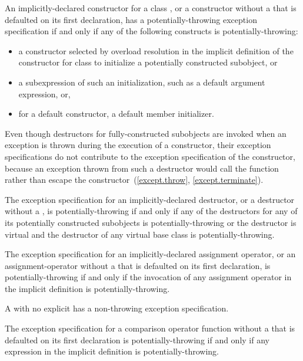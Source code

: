 \pnum
An implicitly-declared constructor for a class ,
or a constructor without a 
that is defaulted on its first declaration,
has a potentially-throwing exception specification
if and only if
any of the following constructs is potentially-throwing:
\begin{itemize}
\item
a constructor selected by overload resolution
in the implicit definition of the constructor
for class 
to initialize a potentially constructed subobject, or
\item
a subexpression of such an initialization,
such as a default argument expression, or,
\item
for a default constructor, a default member initializer.
\end{itemize}
\begin{note}
Even though destructors for fully-constructed subobjects
are invoked when an exception is thrown
during the execution of a constructor,
their exception specifications do not contribute
to the exception specification of the constructor,
because an exception thrown from such a destructor
would call the function 
rather than escape the constructor~(\ref{except.throw}, \ref{except.terminate}).
\end{note}

\pnum
The exception specification for an implicitly-declared destructor,
or a destructor without a ,
is potentially-throwing if and only if
any of the destructors
for any of its potentially constructed subobjects
is potentially-throwing or
the destructor is virtual and the destructor of any virtual base class
is potentially-throwing.

\pnum
The exception specification for an implicitly-declared assignment operator,
or an assignment-operator without a 
that is defaulted on its first declaration,
is potentially-throwing if and only if
the invocation of any assignment operator
in the implicit definition is potentially-throwing.

\pnum
A 
with no explicit 
has a non-throwing exception specification.

\pnum
The exception specification for a comparison operator function
without a 
that is defaulted on its first declaration
is potentially-throwing if and only if
any expression
in the implicit definition is potentially-throwing.

